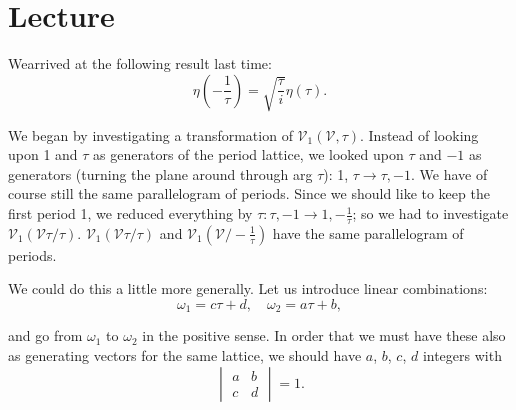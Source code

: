 \chapter{Lecture}\label{part2:lec13} %

We\pageoriginale arrived at the following  result last time:
$$
\eta \left(- \frac{1}{\tau}\right) = \sqrt{\frac{\tau}{i}} \eta (\tau).
$$

We began by investigating a transformation of $\mathscr{V}_1
(\mathscr{V}, \tau)$. Instead of looking upon 1 and $\tau$ as
generators of the period lattice, we looked upon $\tau$ and $-1$ as
generators (turning the plane around through arg $\tau$): 1, $\tau \to
\tau, -1$. We have of course still the same parallelogram of
periods. Since we should like to keep the first period 1, we reduced
everything by $\tau: \tau, -1 \to 1, - \frac{1}{\tau}$; so we had to
investigate $\mathscr{V}_1 (\mathscr{V} \tau/\tau)$. $\mathscr{V}_1 (
\mathscr{V} \tau/\tau)$ and $\mathscr{V}_1
(\mathscr{V}/-\frac{1}{\tau})$ have the same parallelogram of
periods. 

We could do this a little more generally. Let us introduce linear
combinations: 
$$
\omega_1 = c \tau+d, \quad \omega_2=a\tau +b,
$$

\noindent 
\begin{minipage}[c]{4.5cm}
  and go from $\omega_1$ to $\omega_2$ in the positive sense. In order
  that we must have these also as generating vectors for the same
  lattice, we should have $a$, $b$, $c$, $d$ integers with
  $$
  \begin{vmatrix}
    a & b\\
    c & d
  \end{vmatrix}= 1.
  $$
\end{minipage}
\begin{minipage}[c]{5cm}
  \begin{figure}[H]
  \end{figure}
\end{minipage}

